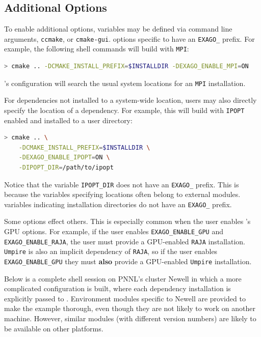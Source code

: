 \subsection{Additional Options}

To enable additional options, \cmake variables may be defined via \cmake command line arguments, \texttt{ccmake}, or \texttt{cmake-gui}.
\cmake options specific to \exago have an \texttt{EXAGO\_} prefix.
For example, the following shell commands will build \exago with \texttt{MPI}:

\begin{lstlisting}[language=bash]
> cmake .. -DCMAKE_INSTALL_PREFIX=$INSTALLDIR -DEXAGO_ENABLE_MPI=ON
\end{lstlisting}

\noindent
\exago's \cmake configuration will search the usual system locations for an \texttt{MPI} installation.

For dependencies not installed to a system-wide location, users may also directly specify the location of a dependency.
For example, this will build \exago with \texttt{IPOPT} enabled and installed to a user directory:

\begin{lstlisting}[language=bash]
> cmake .. \
    -DCMAKE_INSTALL_PREFIX=$INSTALLDIR \
    -DEXAGO_ENABLE_IPOPT=ON \
    -DIPOPT_DIR=/path/to/ipopt
\end{lstlisting}

\noindent
Notice that the \cmake variable \texttt{IPOPT\_DIR} does not have an \texttt{EXAGO\_} prefix.
This is because the variables specifying locations often belong to external \cmake modules.
\cmake variables indicating installation directories do not have an \texttt{EXAGO\_} prefix.

Some \cmake options effect others.
This is especially common when the user enables \exago's GPU options.
For example, if the user enables \texttt{EXAGO\_ENABLE\_GPU} and \texttt{EXAGO\_ENABLE\_RAJA}, the user must provide a GPU-enabled \texttt{RAJA} installation.
\texttt{Umpire} is also an implicit dependency of \texttt{RAJA}, so if the user enables \texttt{EXAGO\_ENABLE\_GPU} they must \textbf{also} provide a GPU-enabled \texttt{Umpire} installation.

Below is a complete shell session on PNNL's cluster Newell in which a more complicated \exago configuration is built, where each dependency installation is explicitly passed to \cmake.
Environment modules specific to Newell are provided to make the example
thorough, even though they are not likely to work on another machine. However,
similar modules (with different version numbers) are likely to be available on
other platforms.

